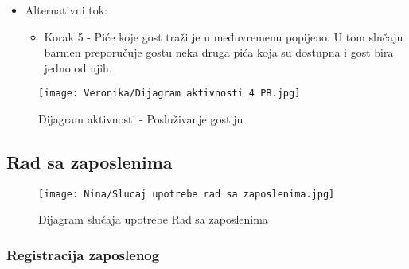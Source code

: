 \documentclass[a4paper]{article}
\begin{document}
\begin{itemize}
    \item Alternativni tok:
        \begin{itemize}
	      \item	Korak 5 - Piće koje gost traži je u međuvremenu popijeno. U tom slučaju barmen preporučuje gostu neka druga pića koja su dostupna i gost bira jedno od njih.

        \end{itemize}
\end{itemize}

\begin{figure}[H]
    \centering
    \texttt{[image: Veronika/Dijagram aktivnosti 4 PB.jpg]}
    \caption{Dijagram aktivnosti - Posluživanje gostiju}
    \label{fig:PrenosiviBar}
\end{figure}

\subsection{Rad sa zaposlenima}

\begin{figure}[H]
    \centering
    \texttt{[image: Nina/Slucaj upotrebe rad sa zaposlenima.jpg]}
    \caption{Dijagram slučaja upotrebe Rad sa zaposlenima}
    \label{fig:RegistracijaZ}
\end{figure}

\subsubsection{Registracija zaposlenog}
\end{document}
